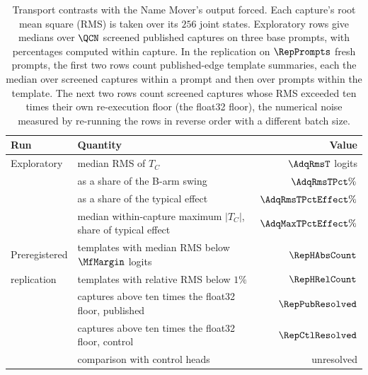 \documentclass{article}
\theoremstyle{plain}
\theoremstyle{definition}
\begin{document}
\begin{table}[t]
\centering
\small
\caption{Transport contrasts with the Name Mover's output forced. Each capture's root
mean square (RMS) is taken over its $256$ joint states. Exploratory rows give medians over $\QCN$ screened published
captures on three base prompts, with percentages computed within capture. In the replication on $\RepPrompts$ fresh
prompts, the first two rows count published-edge template summaries, each the median over screened captures within a
prompt and then over prompts within the template. The next two rows count screened captures whose RMS exceeded ten
times their own re-execution floor (the float32 floor), the numerical noise measured by re-running the rows in reverse order with a different batch size.}
\label{tab:transport}
\begin{tabular}{llr}
\toprule
Run & Quantity & Value\\
\midrule
Exploratory & median RMS of $T_C$ & $\AdqRmsT$ logits\\
 & \quad as a share of the B-arm swing & $\AdqRmsTPct\%$\\
 & \quad as a share of the typical effect & $\AdqRmsTPctEffect\%$\\
 & median within-capture maximum $|T_C|$, share of typical effect & $\AdqMaxTPctEffect\%$\\
\midrule
Preregistered & templates with median RMS below $\MfMargin$ logits & $\RepHAbsCount$\\
replication & templates with relative RMS below $1\%$ & $\RepHRelCount$\\
 & captures above ten times the float32 floor, published & $\RepPubResolved$\\
 & captures above ten times the float32 floor, control & $\RepCtlResolved$\\
 & comparison with control heads & unresolved\\
\bottomrule
\end{tabular}
\end{table}
\end{document}
